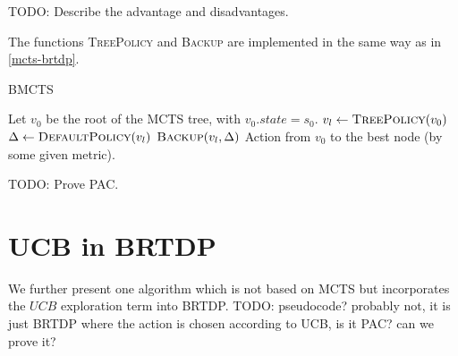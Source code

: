 TODO: Describe the advantage and disadvantages.

The functions \textsc{TreePolicy} and \textsc{Backup} are implemented in
the same way as in \autoref{mcts-brtdp}.

\begin{algorithm}
\caption{BMCTS}
\label{bmcts}
\begin{algorithmic}
    \State Let $v_0$ be the root of the MCTS tree, with $v_0.state = s_0$.
        \State $v_l \gets \Call{TreePolicy}{v_0}$
        \State $\Delta \gets \Call{DefaultPolicy}{v_l}$
        \State $\Call{Backup}{v_l, \Delta}$
    \EndWhile
    \State \Return Action from $v_0$ to the best node (by some
    given metric).
\EndFunction

\EndFunction

\end{algorithmic}
\end{algorithm}


TODO: Prove PAC.


\section{UCB in BRTDP}

We further present one algorithm which is not based on MCTS but
incorporates the $UCB$ exploration term into BRTDP. TODO: pseudocode?
probably not, it is just BRTDP where the action is chosen according to
UCB, is it PAC? can we prove it?
